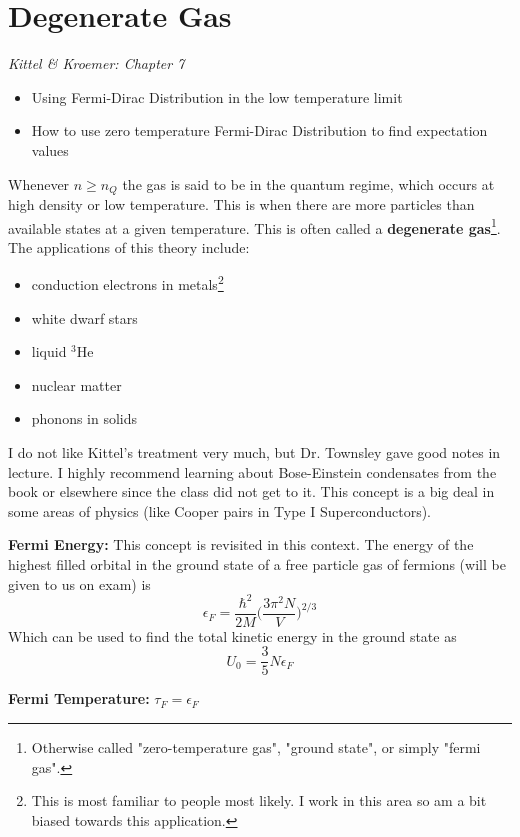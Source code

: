 \section{Degenerate Gas}

\emph{Kittel \& Kroemer: Chapter 7}
\begin{itemize}
    \item Using Fermi-Dirac Distribution in the low temperature limit
    \item How to use zero temperature Fermi-Dirac Distribution to find expectation values
\end{itemize}

Whenever $n \geq n_Q$ the gas is said to be in the quantum regime, which occurs at high density or low temperature. This is when there are more particles than available states at a given temperature. This is often called a \textbf{degenerate gas}\footnote{Otherwise called "zero-temperature gas", "ground state", or simply "fermi gas".}. The applications of this theory include:
\begin{itemize}
    \item conduction electrons in metals\footnote{This is most familiar to people most likely. I work in this area so am a bit biased towards this application.}
    \item white dwarf stars
    \item liquid $^3$He
    \item nuclear matter
    \item phonons in solids
\end{itemize}
I do not like Kittel's treatment very much, but Dr. Townsley gave good notes in lecture. I highly recommend learning about Bose-Einstein condensates from the book or elsewhere since the class did not get to it. This concept is a big deal in some areas of physics (like Cooper pairs in Type I Superconductors).

\textbf{Fermi Energy:} This concept is revisited in this context. The energy of the highest filled orbital in the ground state of a free particle gas of fermions (will be given to us on exam) is
\[
\epsilon_F = \frac{\hbar^2}{2M} \bigg( \frac{3\pi^2N}{V} \bigg)^{2/3}
\]
Which can be used to find the total kinetic energy in the ground state as 
\[
U_0 = \frac{3}{5} N \epsilon_F
\]

\textbf{Fermi Temperature:} $\tau_F = \epsilon_F$

